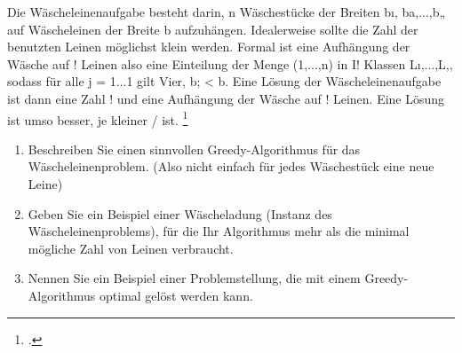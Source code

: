 \documentclass{bschlangaul-aufgabe}
\begin{document}

Die Wäscheleinenaufgabe besteht darin, n Wäschestücke der Breiten bı,
ba,...,b„ auf Wäscheleinen der Breite b aufzuhängen. Idealerweise sollte
die Zahl der benutzten Leinen möglichst klein werden. Formal ist eine
Aufhängung der Wäsche auf ! Leinen also eine Einteilung der Menge
(1,...,n) in I! Klassen Lı,...,L,, sodass für alle j = 1...1 gilt Vier,
b; < b. Eine Lösung der Wäscheleinenaufgabe ist dann eine Zahl ! und
eine Aufhängung der Wäsche auf ! Leinen. Eine Lösung ist umso besser, je
kleiner / ist.
\footcite[Seite 6]{examen:66115:2009:09}

\begin{enumerate}


\item Beschreiben Sie einen sinnvollen Greedy-Algorithmus für das
Wäscheleinenproblem. (Also nicht einfach für jedes Wäschestück eine neue
Leine)


\item Geben Sie ein Beispiel einer Wäscheladung (Instanz des
Wäscheleinenproblems), für die Ihr Algorithmus mehr als die minimal
mögliche Zahl von Leinen verbraucht.


\item Nennen Sie ein Beispiel einer Problemstellung, die mit einem
Greedy-Algorithmus optimal gelöst werden kann.

\end{enumerate}
\end{document}
